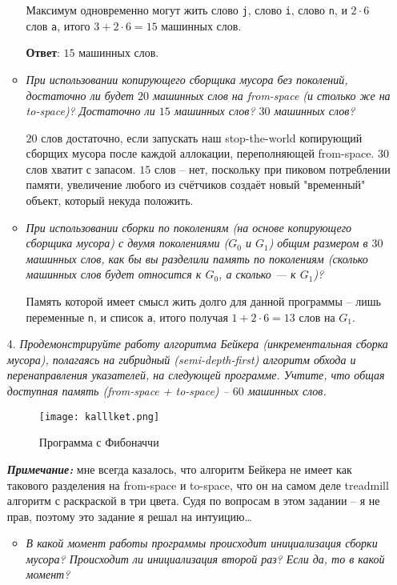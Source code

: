 \documentclass{article}
\begin{document}
\begin{enumerate}
\begin{itemize}
        Максимум одновременно могут жить слово \texttt{j}, слово \texttt{i}, слово \texttt{n}, и $2 \cdot 6$ слов \texttt{a}, итого $3 + 2\cdot 6 = 15$ машинных слов.

        \textbf{Ответ}: $15$ машинных слов.

        \item \textit{При использовании копирующего сборщика мусора без поколений, достаточно ли будет $20$ машинных слов на from-space (и столько же на to-space)? Достаточно ли $15$ машинных слов? $30$ машинных слов?}

        $20$ слов достаточно, если запускать наш stop-the-world копирующий сборщих мусора после каждой аллокации, переполняющей from-space. $30$ слов хватит с запасом. $15$ слов -- нет, поскольку при пиковом потреблении памяти, увеличение любого из счётчиков создаёт новый "временный" объект, который некуда положить.

        \item \textit{При использовании сборки по поколениям (на основе копирующего сборщика мусора) с двумя поколениями ($G_0$ и $G_1$) общим размером в $30$ машинных слов, как бы вы разделили память по поколениям (сколько машинных слов будет относится к $G_0$, а сколько — к $G_1$)?}

        Память которой имеет смысл жить долго для данной программы -- лишь переменные \texttt{n}, и список \texttt{a}, итого получая $1 + 2\cdot6 = 13$ слов на $G_1$.
    \end{itemize}

    \item[4.] \textit{Продемонстрируйте работу алгоритма Бейкера (инкрементальная сборка мусора), полагаясь на гибридный (semi-depth-first) алгоритм обхода и перенаправления указателей, на следующей программе. Учтите, что общая доступная память (from-space + to-space) -- $60$ машинных слов.}

    \begin{figure}[h]
    \centering
    \texttt{[image: kalllket.png]}
    \caption{Программа с Фибоначчи}
    \label{fig:name}
    \end{figure}

    \textbf{\textit{Примечание:}} мне всегда казалось, что алгоритм Бейкера не имеет как такового разделения на from-space и to-space, что он на самом деле treadmill алгоритм с раскраской в три цвета. Судя по вопросам в этом задании -- я не прав, поэтому это задание я решал на интуицию\ldots

    \begin{itemize}
        \item \textit{В какой момент работы программы происходит инициализация сборки мусора? Происходит ли инициализация второй раз? Если да, то в какой момент?}


\end{itemize}
\end{enumerate}
\end{document}
